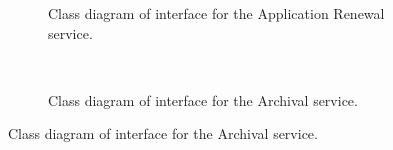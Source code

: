 \documentclass[12pt]{article}
\begin{document}
\begin{figure}[p]
\begin{subfigure}[p]{0.47\textwidth}
\centering	
{}
\caption{Class diagram of interface for the Application Renewal service.}
\end{subfigure}
~
\begin{subfigure}[p]{0.47\textwidth}
\centering	
{}
\caption{Class diagram of interface for the Archival service.}
\end{subfigure}


\end{figure}
\end{document}
